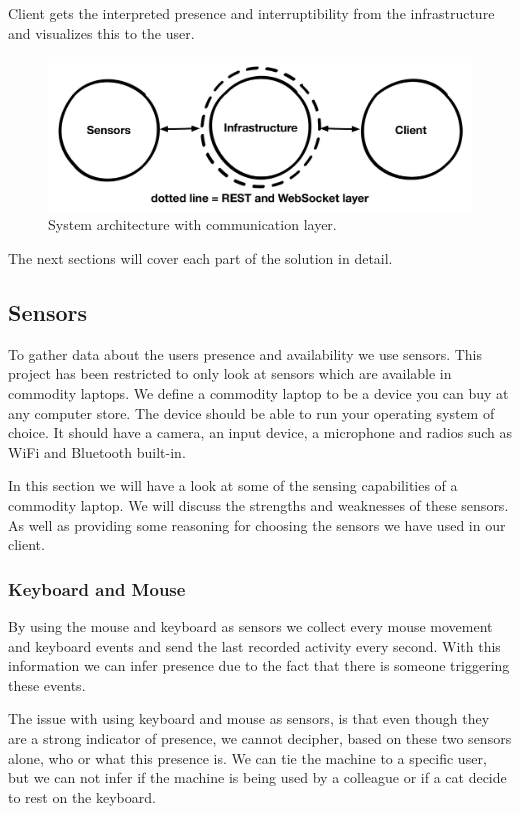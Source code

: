 \documentclass{sigchi}
\begin{document}
Client gets the interpreted presence and interruptibility from the infrastructure and visualizes this to the user.

\begin{figure}[H]
  \centering
  \includegraphics[width=\columnwidth]{figures/system_architecture.pdf}
  \caption{System architecture with communication layer.}
  \label{fig:architecture}
\end{figure}

The next sections will cover each part of the solution in detail.

\subsection{Sensors}
To gather data about the users presence and availability we use sensors.
This project has been restricted to only look at sensors which are available in commodity laptops.
We define a commodity laptop to be a device you can buy at any computer store.
The device should be able to run your operating system of choice.
It should have a camera, an input device, a microphone and radios such as WiFi and Bluetooth built-in.

In this section we will have a look at some of the sensing capabilities of a commodity laptop.
We will discuss the strengths and weaknesses of these sensors.
As well as providing some reasoning for choosing the sensors we have used in our client.

\subsubsection{Keyboard and Mouse}
By using the mouse and keyboard as sensors we collect every mouse movement and keyboard events and send the last recorded activity every second.
With this information we can infer presence due to the fact that there is someone triggering these events.

The issue with using keyboard and mouse as sensors, is that even though they are a strong indicator of presence, we cannot decipher, based on these two sensors alone, who or what this presence is.
We can tie the machine to a specific user, but we can not infer if the machine is being used by a colleague or if a cat decide to rest on the keyboard.
\end{document}
